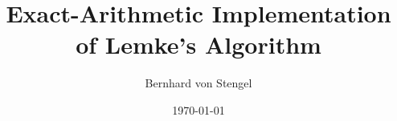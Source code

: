 \documentclass[a4paper,12pt]{article}  %
\title{%
Exact-Arithmetic Implementation of Lemke's Algorithm 
}
\author{Bernhard von Stengel}
\date{\today
\\[1ex]
}
\theoremstyle{definition}
\newcommand{\0}{{\mathbf0}}
\newcommand{\1}{{\mathbf1}}
\begin{document}
\maketitle




\small

 
\end{document}
